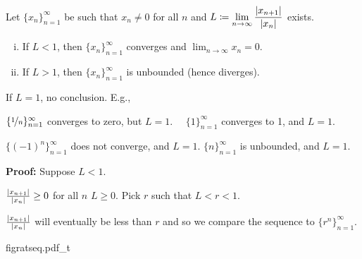 \documentclass[10pt,aspectratio=149]{beamer}
\begin{document}
\begin{frame}

\begin{lemma}
Let $\{ x_n \}_{n=1}^\infty$ be such that $x_n \not= 0$ for all $n$ and
$\displaystyle L \coloneqq \lim_{n\to\infty} \frac{\left\lvert {x_{n+1}} \right\rvert}{\left\lvert {x_n} \right\rvert}$ exists.
\pause
\begin{enumerate}[(i)]
\item
If $L < 1$, then $\{ x_n \}_{n=1}^\infty$ converges and $\displaystyle \lim_{n\to\infty} x_n = 0$.
\item
\pause
If $L > 1$, then $\{ x_n \}_{n=1}^\infty$ is unbounded (hence diverges).
\end{enumerate}
\end{lemma}

\pause
If $L=1$, no conclusion. E.g.,

\pause
$\{ \nicefrac{1}{n} \}_{n=1}^\infty$ converges to zero, but $L=1$.
\pause
\quad\qquad~\,
$\{ 1 \}_{n=1}^\infty$ converges to 1, and $L=1$.

\pause
$\{ {(-1)}^n \}_{n=1}^\infty$ does not converge, and $L=1$.
\pause
\qquad
$\{  n \}_{n=1}^\infty$ is unbounded, and $L=1$.

\pause
\medskip

\textbf{Proof:}
Suppose $L < 1$.

\pause
\medskip

$\frac{\left\lvert {x_{n+1}} \right\rvert}{\left\lvert {x_n} \right\rvert} \geq 0$ for all $n$ \wthus $L \geq 0$.
\qquad
\pause
Pick $r$ such that $L < r < 1$.

\pause
\medskip

$\frac{\left\lvert {x_{n+1}} \right\rvert}{\left\lvert {x_n} \right\rvert}$ will eventually be less than $r$ and
so we compare the sequence to $\{ r^n \}_{n=1}^\infty$.

\pause
\begin{center}
{figratseq.pdf_t}
\end{center}

\end{frame}
\end{document}
